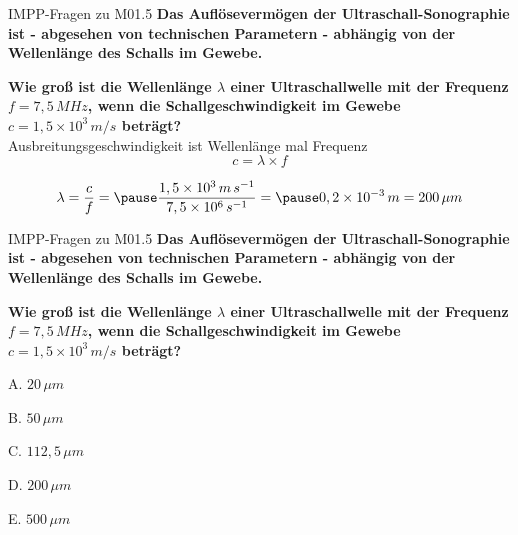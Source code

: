 \documentclass{beamer}
\begin{document}
\begin{frame}{IMPP-Fragen zu M01.5}
\textbf{Das Auflösevermögen der Ultraschall-Sonographie ist - abgesehen von technischen Parametern - abhängig von der Wellenlänge des Schalls im Gewebe.}

\textbf{
Wie groß ist die Wellenlänge \(\lambda\) einer Ultraschallwelle mit der Frequenz \(f=7,5\,MHz\), wenn die Schallgeschwindigkeit im Gewebe \(c=1,5\times 10^3\,m/s\) beträgt?} \\[0.2 cm]

Ausbreitungsgeschwindigkeit ist Wellenlänge mal Frequenz \\

\[c = \lambda \times f \]

\pause

\[
\lambda = \frac{c}{f} =  \pause \frac{1,5\times 10^3\,m\,s^{-1}}{7,5 \times 10^6\,s^{-1}} = \pause 0,2\times 10^{-3}\,m = 200\,\mu m
\]

\end{frame}

\begin{frame}{IMPP-Fragen zu M01.5}
\textbf{Das Auflösevermögen der Ultraschall-Sonographie ist - abgesehen von technischen Parametern - abhängig von der Wellenlänge des Schalls im Gewebe.}

\textbf{
Wie groß ist die Wellenlänge \(\lambda\) einer Ultraschallwelle mit der Frequenz \(f=7,5\,MHz\), wenn die Schallgeschwindigkeit im Gewebe \(c=1,5\times 10^3\,m/s\) beträgt?} \\[0.2 cm]

\begin{description}
\item{A.} \(20\,\mu m\)
\item{B.} \(50\,\mu m\)
\item{C.} \(112,5\,\mu m\)
\item{D.} \textcolor{theme}{\(200\,\mu m\)} %
\item{E.} \(500\,\mu m\)

\end{description}
\end{frame}

\end{document}
